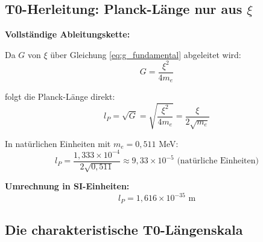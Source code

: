\documentclass[12pt,a4paper]{article}
\begin{document}
	\subsection{T0-Herleitung: Planck-L{\"a}nge nur aus $\xi$}
	
	\begin{keyresult}
		\textbf{Vollst{\"a}ndige Ableitungskette:}
		
		Da $G$ von $\xi$ {\"u}ber Gleichung \eqref{eq:g_fundamental} abgeleitet wird:
		\begin{equation}
			G = \frac{\xi^2}{4 m_e}
		\end{equation}
		
		folgt die Planck-L{\"a}nge direkt:
		\begin{equation}
			l_P = \sqrt{G} = \sqrt{\frac{\xi^2}{4 m_e}} = \frac{\xi}{2\sqrt{m_e}}
		\end{equation}
		
		In nat{\"u}rlichen Einheiten mit $m_e = 0{,}511$ MeV:
		\begin{equation}
			l_P = \frac{1{,}333 \times 10^{-4}}{2\sqrt{0{,}511}} \approx 9{,}33 \times 10^{-5} \text{ (nat{\"u}rliche Einheiten)}
		\end{equation}
		
		\textbf{Umrechnung in SI-Einheiten:}
		\begin{equation}
			\boxed{l_P = 1{,}616 \times 10^{-35} \text{ m}}
		\end{equation}
	\end{keyresult}
	
	\subsection{Die charakteristische T0-L{\"a}ngenskala}
	
\end{document}
